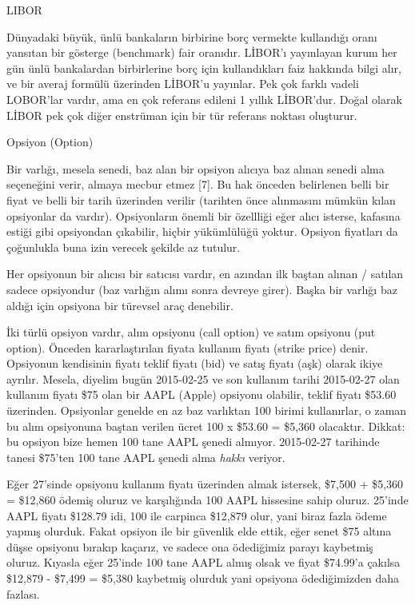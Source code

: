 \documentclass[12pt,fleqn]{article}\usepackage{../../common}
\begin{document}
LIBOR

Dünyadaki büyük, ünlü bankaların birbirine borç vermekte kullandığı oranı
yansıtan bir gösterge (benchmark) fair oranıdır. LİBOR'ı yayınlayan kurum her
gün ünlü bankalardan birbirlerine borç için kullandıkları faiz hakkında bilgi
alır, ve bir averaj formülü üzerinden LİBOR'u yayınlar. Pek çok farklı vadeli
LOBOR'lar vardır, ama en çok referans edileni 1 yıllık LİBOR'dur. Doğal olarak
LİBOR pek çok diğer enstrüman için bir tür referans noktası oluşturur.

Opsiyon (Option)

Bir varlığı, mesela senedi, baz alan bir opsiyon alıcıya baz alınan senedi alma
seçeneğini verir, almaya mecbur etmez [7]. Bu hak önceden belirlenen belli bir
fiyat ve belli bir tarih üzerinden verilir (tarihten önce alınmasını mümkün
kılan opsiyonlar da vardır). Opsiyonların önemli bir özellliği eğer alıcı
isterse, kafasına estiği gibi opsiyondan çıkabilir, hiçbir yükümlülüğü
yoktur. Opsiyon fiyatları da çoğunlukla buna izin verecek şekilde az tutulur. 

Her opsiyonun bir alıcısı bir satıcısı vardır, en azından ilk baştan alınan /
satılan sadece opsiyondur (baz varlığın alımı sonra devreye girer). Başka bir
varlığı baz aldığı için opsiyona bir türevsel araç denebilir.

İki türlü opsiyon vardır, alım opsiyonu (call option) ve satım opsiyonu (put
option). Önceden kararlaştırılan fiyata kullanım fiyatı (strike price)
denir. Opsiyonun kendisinin fiyatı teklif fiyatı (bid) ve satış fiyatı (aşk)
olarak ikiye ayrılır. Mesela, diyelim bugün 2015-02-25 ve son kullanım tarihi
2015-02-27 olan kullanım fiyatı \$75 olan bir AAPL (Apple) opsiyonu olabilir,
teklif fiyatı \$53.60 üzerinden. Opsiyonlar genelde en az baz varlıktan 100
birimi kullanırlar, o zaman bu alım opsiyonuna baştan verilen ücret 100 x
\$53.60 = \$5,360 olacaktır. Dikkat: bu opsiyon bize hemen 100 tane AAPL şenedi
almıyor. 2015-02-27 tarihinde tanesi \$75'ten 100 tane AAPL şenedi alma {\em
 hakkı} veriyor.

Eğer 27'sinde opsiyonu kullanım fiyatı üzerinden almak istersek, \$7,500 +
\$5,360 = \$12,860 ödemiş oluruz ve karşılığında 100 AAPL hissesine sahip
oluruz. 25'inde AAPL fiyatı \$128.79 idi, 100 ile carpinca \$12,879 olur, yani
biraz fazla ödeme yapmış olurduk. Fakat opsiyon ile bir güvenlik elde ettik,
eğer senet \$75 altına düşse opsiyonu bırakıp kaçarız, ve sadece ona ödediğimiz
parayı kaybetmiş oluruz. Kıyasla eğer 25'inde 100 tane AAPL almış olsak ve fiyat
\$74.99'a çakılsa \$12,879 - \$7,499 = \$5,380 kaybetmiş olurduk yani opsiyona
ödediğimizden daha fazlası.
\end{document}
